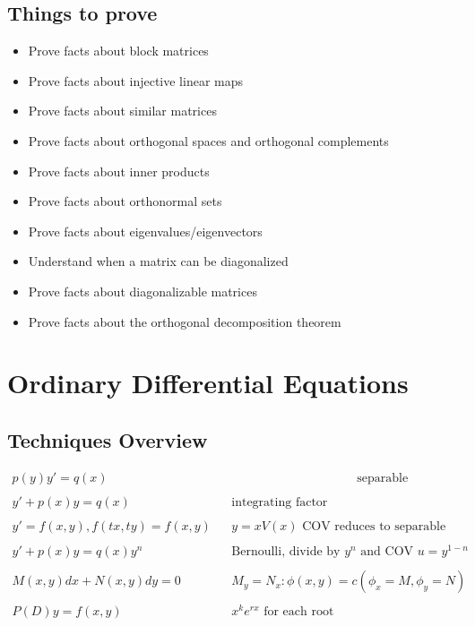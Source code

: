 \hypertarget{things-to-prove}{%
\subsection{Things to prove}\label{things-to-prove}}

\begin{itemize}
\tightlist
\item
  Prove facts about block matrices
\item
  Prove facts about injective linear maps
\item
  Prove facts about similar matrices
\item
  Prove facts about orthogonal spaces and orthogonal complements
\item
  Prove facts about inner products
\item
  Prove facts about orthonormal sets
\item
  Prove facts about eigenvalues/eigenvectors
\item
  Understand when a matrix can be diagonalized
\item
  Prove facts about diagonalizable matrices
\item
  Prove facts about the orthogonal decomposition theorem
\end{itemize}

\hypertarget{ordinary-differential-equations}{%
\section{Ordinary Differential
Equations}\label{ordinary-differential-equations}}

\hypertarget{techniques-overview}{%
\subsection{Techniques Overview}\label{techniques-overview}}

\begin{align*}
p(y)y' = q(x) && \hspace{10em} \text{separable} \\ \\
y'+p(x)y = q(x) && \text{integrating factor} \\ \\
y' = f(x,y), f(tx,ty) = f(x,y) && y = xV(x)\text{ COV reduces to separable} \\ \\
y' +p(x)y = q(x)y^n && \text{Bernoulli, divide by $y^n$ and COV $u = y^{1-n}$} \\ \\
M(x,y)dx + N(x,y)dy = 0 && M_y = N_x: \phi(x,y) = c (\phi_x =M, \phi_y = N) \\ \\
P(D)y = f(x,y) && x^ke^{rx} \text{ for each root }
\end{align*}

